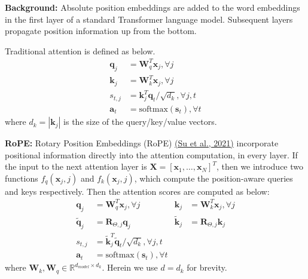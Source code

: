 \documentclass[11pt,addpoints,answers]{exam}
\newcommand{\Rb}{\mathbb{R}}
\newcommand{\av}{\mathbf{a}}
\newcommand{\kv}{\mathbf{k}}
\newcommand{\qv}{\mathbf{q}}
\newcommand{\sv}{\mathbf{s}}
\newcommand{\xv}{\mathbf{x}}
\newcommand{\Rv}{\mathbf{R}}
\newcommand{\Wv}{\mathbf{W}}
\newcommand{\Xv}{\mathbf{X}}
\begin{document}
\begin{questions}
    \textbf{Background:}
    Absolute position embeddings are added to the word embeddings in the first layer of a standard Transformer language model. Subsequent layers propagate position information up from the bottom. 

    Traditional attention is defined as below.
    \begin{align*}
        \qv_j &= \Wv_q^T \xv_j, \forall j \\
        \kv_j &= \Wv_k^T \xv_j, \forall j \\
        s_{t,j} &= \kv_j^T \qv_t / \sqrt{d_k}, \forall j,t\\
        \av_t &= \text{softmax}(\sv_t), \forall t
    \end{align*}
    where $d_k = |\kv_j|$ is the size of the query/key/value vectors.

    \textbf{RoPE:}
    Rotary Position Embeddings (RoPE) \href{https://arxiv.org/pdf/2104.09864.pdf}{(Su et al., 2021)} incorporate positional information directly into the attention computation, in every layer. If the input to the next attention layer is $\Xv = [\xv_1, \ldots, \xv_N]^T$, then we introduce two functions $f_q(\xv_j, j)$ and $f_k(\xv_j, j)$, which compute the position-aware queries and keys respectively. Then the attention scores are computed as below:
    \renewcommand{\tilde}{\widetilde}
    \begin{align*}
        \qv_j &= \Wv_q^T \xv_j, \forall j 
        & \kv_j &= \Wv_k^T \xv_j, \forall j \\
        \tilde{\qv}_j &= \Rv_{\Theta,j} \qv_j
        & \tilde{\kv}_j &= \Rv_{\Theta,j} \kv_j \\
        s_{t,j} &= \tilde{\kv}_j^T \tilde{\qv}_t / \sqrt{d_k}, \forall j,t\\
        \av_t &= \text{softmax}(\sv_t), \forall t
    \end{align*}
    where $\Wv_k, \Wv_q \in \Rb^{d_{model} \times d_k}$. 
    Herein we use $d = d_k$ for brevity. 

\end{questions}
\end{document}
